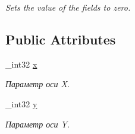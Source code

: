\begin{DoxyCompactItemize}
\begin{DoxyCompactList}\small\item\em Sets the value of the fields to zero. \end{DoxyCompactList}\end{DoxyCompactItemize}
\subsection*{Public Attributes}
\begin{DoxyCompactItemize}
\item 
\hypertarget{classbt_1_1vector2i_a43564ca8e0917005f86cd94d45e9bc2a}{\-\_\-int32 \hyperlink{classbt_1_1vector2i_a43564ca8e0917005f86cd94d45e9bc2a}{x}}\label{classbt_1_1vector2i_a43564ca8e0917005f86cd94d45e9bc2a}

\begin{DoxyCompactList}\small\item\em Параметр оси X. \end{DoxyCompactList}\item 
\hypertarget{classbt_1_1vector2i_aab7c9cb8202294dc06d99bee8e6605e5}{\-\_\-int32 \hyperlink{classbt_1_1vector2i_aab7c9cb8202294dc06d99bee8e6605e5}{y}}\label{classbt_1_1vector2i_aab7c9cb8202294dc06d99bee8e6605e5}

\begin{DoxyCompactList}\small\item\em Параметр оси Y. \end{DoxyCompactList}\end{DoxyCompactItemize}
